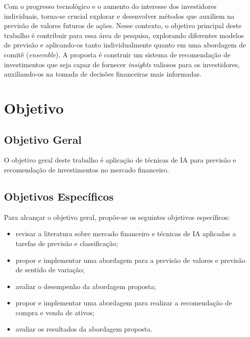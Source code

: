 Com o progresso tecnológico e o aumento do interesse dos investidores individuais, torna-se crucial explorar e desenvolver métodos que auxiliem na previsão de valores futuros de ações. Nesse contexto, o objetivo principal deste trabalho é contribuir para essa área de pesquisa, explorando diferentes modelos de previsão e aplicando-os tanto individualmente quanto em uma abordagem de comitê (\textit{ensemble}). A proposta é construir um sistema de recomendação de investimentos que seja capaz de fornecer \textit{insights} valiosos para os investidores, auxiliando-os na tomada de decisões financeiras mais informadas. 

\section{Objetivo}
\label{subsec:objetivo}
\subsection{Objetivo Geral}
\label{subsubsec:objetivo_geral}
O objetivo geral deste trabalho é aplicação de técnicas de \ac{IA} para previsão e recomendação de investimentos no mercado financeiro.

\subsection{Objetivos Específicos}
\label{subsubsec:objetivo_especifico}
Para alcançar o objetivo geral, propõe-se os seguintes objetivos específicos:

\begin{itemize}
    \item revisar a literatura sobre mercado financeiro e técnicas de \ac{IA} aplicadas a tarefas de previsão e classificação;
    \item propor e implementar uma abordagem para a previsão de valores e previsão de sentido de variação;
    \item avaliar o desempenho da abordagem proposta;
    \item propor e implementar uma abordagem para realizar a recomendação de compra e venda de ativos;
    \item avaliar os resultados da abordagem proposta.
\end{itemize}


